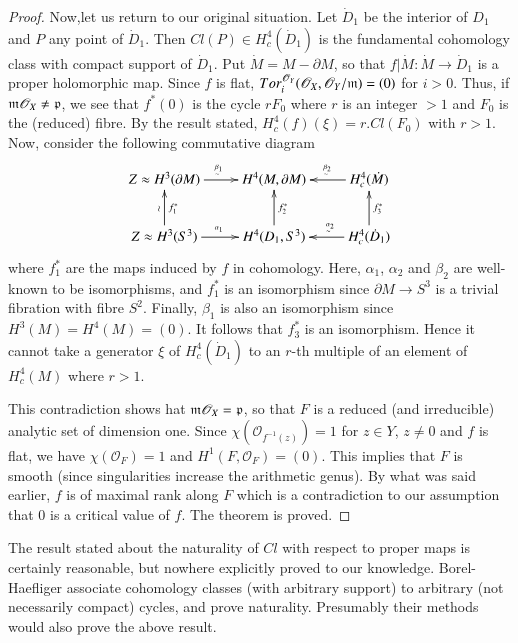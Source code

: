 \begin{proof}
Now,\pageoriginale let us return to our original situation. Let $\dot{D}_1$ be the interior of $D_1$ and $P$ any point of $\dot{D}_1$. Then $Cl (P) \in H^4_c (\dot{D}_1)$ is the fundamental cohomology class with compact support of $\dot{D}_1$. Put $\dot{M} = M - \partial M$, so that $f|\dot{M} : \dot{M} \to \dot{D}_1$ is a proper holomorphic map. Since $f$ is flat, $Tor^{\mathscr{O}_Y}_i (\mathscr{O}_X, \mathscr{O}_Y/\mathfrak{m}) = (0)$ for $i > 0$. Thus, if $\mathfrak{m} {\mathscr{O}}_X \neq \mathfrak{p}$, we see that $f^*(0)$ is the cycle $r F_0$ where $r$ is an integer $>1$ and $F_0$ is the (reduced) fibre. By the result stated, $H^4_c(f) (\xi) = r.Cl (F_0)$ with $r >1$. Now, consider the following commutative diagram
\[
\xymatrix{
Z \approx H^3 (\partial M) \ar[r]^{{}_\sim^{\beta_1}} &  H^4 (M, \partial M) & H^4_c (\dot{M}) \ar[l]_-{{}^{\beta_2}_{\sim}}\\Z \approx H^3 (S^3) \ar[r]^{{}^{\alpha_1}} \ar[u]^{\wr}_{f^*_1} & H^4 (D_1, S^3) \ar[u]_{f^*_2} & H^4_c (\dot{D}_1) \ar[l]_>>>>>>{{}_\sim^{\alpha_2}} \ar[u]_{f^*_3}
}
\]
where $f^*_1$ are the maps induced by $f$ in cohomology. Here, $\alpha_1$, $\alpha_2$ and $\beta_2$ are well-known to be isomorphisms, and $f^*_1$ is an isomorphism since $\partial M \to S^3$ is a trivial fibration with fibre $S^2$. Finally, $\beta_1$ is also an isomorphism since $H^3 (M) = H^4 (M) = (0)$. It follows that $f^*_3$ is an isomorphism. Hence it cannot take a generator $\xi$ of $H^4_c (\dot{D}_1)$ to an $r$-th multiple of an element of $H^4_c (M)$ where $r >1$.

This contradiction shows hat $\mathfrak{m} {\mathscr{O}}_X =\mathfrak{p}$, so that $F$ is a reduced (and irreducible) analytic set of dimension one. Since $\chi (\mathscr{O}_{f^{-1}(z)}) =1$ for $z \in Y$, $z \neq 0$ and $f$ is flat, we have $\chi(\mathscr{O}_F) =1$ and $H^1 (F, \mathscr{O}_F) = (0)$. This implies that $F$ is smooth (since singularities increase the arithmetic genus). By what was said earlier, $f$ is of maximal rank along $F$ which is a contradiction to our assumption that 0 is a critical value of $f$. The theorem is proved.
\end{proof}

\begin{remark*}
The result stated about the naturality of $Cl$ with respect to proper maps is certainly reasonable, but nowhere explicitly proved to our knowledge. Borel-Haefliger \cite{art7-key4} associate cohomology classes (with arbitrary support) to arbitrary (not necessarily compact) cycles, and prove naturality. Presumably their methods would also prove the above result.
\end{remark*}

